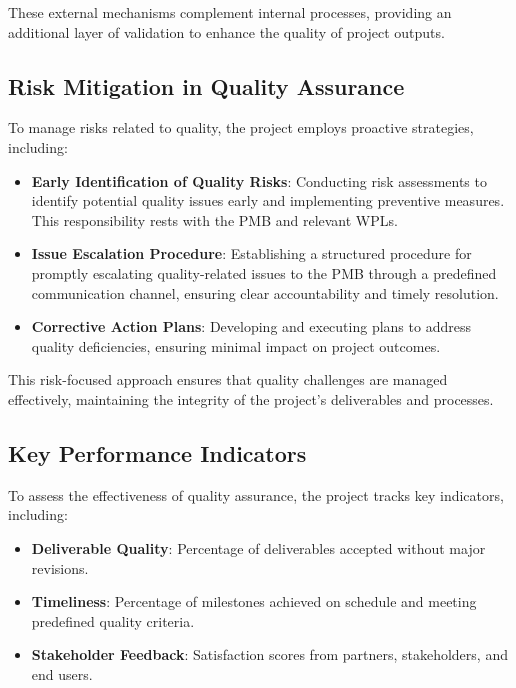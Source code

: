 \documentclass[a4paper,12pt]{article}
\begin{document}
These external mechanisms complement internal processes, providing an additional layer of validation to enhance the quality of project outputs.

\subsection{\textcolor{EUblue}{Risk Mitigation in Quality Assurance}}

To manage risks related to quality, the project employs proactive strategies, including:

\begin{itemize}[left=1em, itemsep=0pt, topsep=0pt]
    \item \textbf{Early Identification of Quality Risks}: Conducting risk assessments to identify potential quality issues early and implementing preventive measures. This responsibility rests with the PMB and relevant WPLs.
    \item \textbf{Issue Escalation Procedure}: Establishing a structured procedure for promptly escalating quality-related issues to the PMB through a predefined communication channel, ensuring clear accountability and timely resolution.
    \item \textbf{Corrective Action Plans}: Developing and executing plans to address quality deficiencies, ensuring minimal impact on project outcomes.
\end{itemize}

This risk-focused approach ensures that quality challenges are managed effectively, maintaining the integrity of the project’s deliverables and processes.

\subsection{\textcolor{EUblue}{Key Performance Indicators}}

To assess the effectiveness of quality assurance, the project tracks key indicators, including:

\begin{itemize}[left=1em, itemsep=0pt, topsep=0pt]
    \item \textbf{Deliverable Quality}: Percentage of deliverables accepted without major revisions.
    \item \textbf{Timeliness}: Percentage of milestones achieved on schedule and meeting predefined quality criteria.
    \item \textbf{Stakeholder Feedback}: Satisfaction scores from partners, stakeholders, and end users.
\end{itemize}
\end{document}
